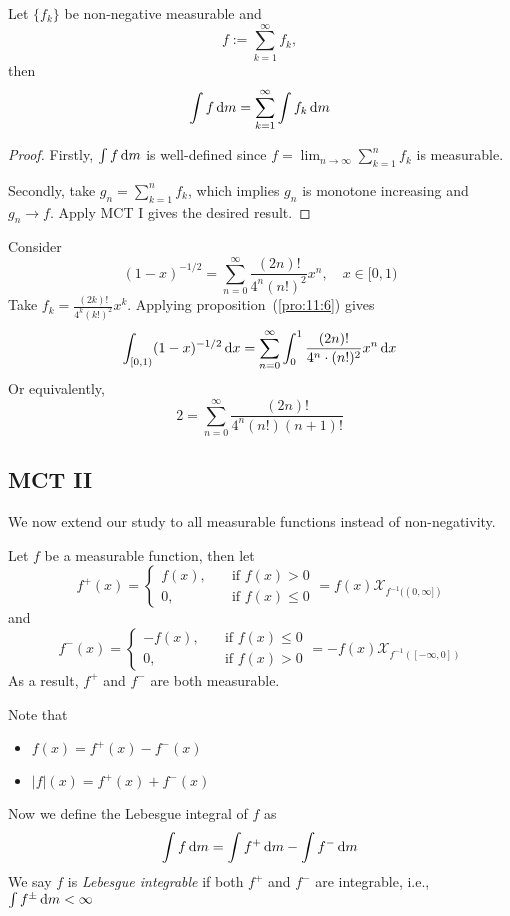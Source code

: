 \begin{proposition}\label{pro:11:6}
Let $\{f_k\}$ be non-negative measurable and 
\[
f:=\sum_{k=1}^\infty f_k,
\]
then 
\[
\int f\,\mathrm{d} m = \sum_{k=1}^\infty \int f_k\,\mathrm{d} m
\]
\end{proposition}
\begin{proof}
Firstly, $\int f\,\mathrm{d} m$ is well-defined since $f=\lim_{n\to\infty}\sum_{k=1}^nf_k$ is measurable.

Secondly, take $g_n = \sum_{k=1}^nf_k$, which implies $g_n$ is monotone increasing and $g_n\to f$.
Apply MCT I gives the desired result.
\end{proof}
\begin{example}
Consider
\[
(1-x)^{-1/2} = \sum_{n=0}^\infty\frac{(2n)!}{4^n(n!)^2}x^n,\quad x\in[0,1)
\]
Take $f_k = \frac{(2k)!}{4^k(k!)^2}x^k$. 
Applying proposition~(\ref{pro:11:6}) gives 
\[
\int_{[0,1)}(1-x)^{-1/2}\,\mathrm{d} x=\sum_{n=0}^\infty\int_0^1\frac{(2n)!}{4^n\cdot (n!)^2}x^n\,\mathrm{d} x
\]
Or equivalently,
\[
2 = \sum_{n=0}^\infty\frac{(2n)!}{4^n(n!)(n+1)!}
\]

\end{example}
\subsection{MCT II}
We now extend our study to all measurable functions instead of non-negativity.
\begin{definition}
Let $f$ be a measurable function, then let
\[
f^+(x) = \left\{
\begin{aligned}
f(x),&\quad\text{if $f(x)>0$}\\
0,&\quad\text{if $f(x)\le0$}
\end{aligned}
\right.
=
f(x)\mathcal{X}_{f^{-1}((0,\infty])}
\]
and
\[
f^-(x) = \left\{
\begin{aligned}
-f(x),&\quad\text{if $f(x)\le0$}\\
0,&\quad\text{if $f(x)>0$}
\end{aligned}
\right.
=
-f(x)\mathcal{X}_{f^{-1}([-\infty,0])}
\]
As a result, $f^+$ and $f^-$ are both measurable.

Note that
\begin{itemize}
\item
$f(x) = f^+(x) - f^-(x)$
\item
$|f|(x) = f^+(x)+f^-(x)$
\end{itemize}
Now we define the Lebesgue integral of $f$ as
\[
\int f\,\mathrm{d} m = \int f^+\,\mathrm{d} m - \int f^-\,\mathrm{d} m
\]
We say $f$ is \emph{Lebesgue integrable} if both $f^+$ and $f^-$ are integrable, i.e., $\int f^{\pm}\,\mathrm{d} m<\infty$
\end{definition}

